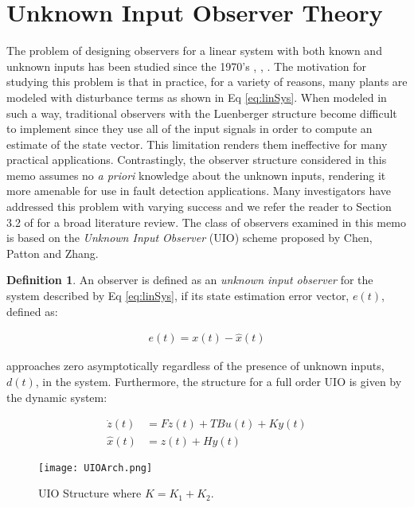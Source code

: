 \documentclass{amsart}
\theoremstyle{definition}
\newtheorem{definition}[theorem]{Definition}
\theoremstyle{remark}
\numberwithin{equation}{section}
\begin{document}
\section{Unknown Input Observer Theory} 

The problem of designing observers for a linear system with both known and unknown inputs has been studied since the 1970's \cite{Chen99}, \cite{Pat89}, \cite{Shaf2015}.  The motivation for studying this problem is that in practice, for a variety of reasons, many plants are modeled with disturbance terms as shown in Eq \ref{eq:linSys}. When modeled in such a way, traditional observers with the Luenberger structure become difficult to implement since they use all of the input signals in order to compute an estimate of the state vector. This limitation renders them ineffective for many practical applications. Contrastingly, the observer structure considered in this memo assumes no \textit{a priori} knowledge about the unknown inputs, rendering it more amenable for use in fault detection applications. Many investigators have addressed this problem with varying success and we refer the reader to Section 3.2 of \cite{Chen99} for a broad literature review. The class of observers examined in this memo is based on the \textit{Unknown Input Observer} (UIO) scheme proposed by Chen, Patton and Zhang.  

\begin{definition}
An observer is defined as an \textit{unknown input observer} \cite{Sch12,Pat89} for the system described by Eq \ref{eq:linSys}, if its state estimation error vector, $e(t)$, defined as:

\begin{align}
e(t) = x(t) - \hat{x}(t)
\end{align}

approaches zero asymptotically regardless of the presence of unknown inputs, $d(t)$, in the system.  Furthermore, the structure for a full order UIO is given by the dynamic system: 

\begin{equation} \label{eq:uio}
\begin{aligned}
\dot{z}(t) &= Fz(t)+TBu(t) + Ky(t) \\
\hat{x}(t) &= z(t)+Hy(t)
\end{aligned}
\end{equation}
\end{definition}

\begin{figure}[H]
    \centering
    \texttt{[image: UIOArch.png]}
    \caption{UIO Structure where $K = K_1 + K_2$.}
    \label{fig:UIOBD}
\end{figure}
\end{document}
